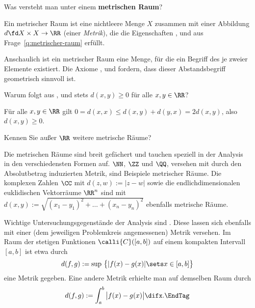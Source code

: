 \begin{frage}
  Was versteht man unter einem 
  \textbf{metrischen Raum}?
\end{frage}

\begin{antwort}
  Ein metrischer Raum ist eine nichtleere Menge $X$ zusammen mit einer 
  Abbildung $d\fd X \times X\to \RR$ (einer \textit{Metrik}), 
  die die Eigenschaften , 
  und  aus Frage~\ref{q:metrischer-raum} erfüllt. 

  Anschaulich ist ein metrischer Raum eine Menge, 
  für die ein Begriff des  je zweier Elemente existiert. 
  Die Axiome ,  und  fordern, 
  dass dieser Abstandsbegriff geometrisch sinnvoll ist. 
  \AntEnd
\end{antwort} 

\begin{frage}
  Warum folgt aus ,  und 
   stets $d(x,y)\ge 0$ für alle 
  $x,y \in\RR$?
\end{frage}

\begin{antwort}
  Für alle $x,y \in \RR$ gilt 
  $0 = d(x,x) \le d(x,y)+d(y,x) = 2d(x,y)$,
  also $d(x,y)\ge 0$. 
  \AntEnd
\end{antwort}

\begin{frage} 
  Kennen Sie außer $\RR$ weitere metrische Räume?
\end{frage}

\begin{antwort}
  Die metrischen Räume sind breit gefächert und tauchen speziell in der 
  Analysis in den verschiedensten Formen auf. 
  $\NN$, $\ZZ$ und $\QQ$, versehen mit durch den Absolutbetrag 
  induzierten Metrik, sind Beispiele metrischer Räume.
  Die komplexen Zahlen $\CC$ mit $d(z,w):=|z-w|$  
  sowie die endlichdimensionalen euklidischen 
  Vektorräume $\RR^n$ sind mit 
  $d(x,y):=\sqrt{(x_1-y_1)^2+\ldots+(x_n-y_n)^2}$ ebenfalls metrische Räume. 

  Wichtige Untersuchungsgegenstände der Analysis sind 
  . Diese lassen sich ebenfalls mit einer 
  (dem jeweiligen Problemkreis angemessenen) Metrik versehen. Im Raum der 
  stetigen Funktionen $\calli{C}([a,b])$ auf einem kompakten 
  Intervall $[a,b]$ ist etwa durch 
  \[
  d(f,g) := \sup\,\big\{ |f(x)-g(x) | \sets x\in [a,b] \big\}
  \]
  eine Metrik gegeben. Eine andere Metrik erhielte man auf demselben Raum 
  {\zB} durch 
  \[
  d(f,g) := \int_a^b \big|f(x)-g(x) \big| \difx. \EndTag
  \]
\end{antwort}

